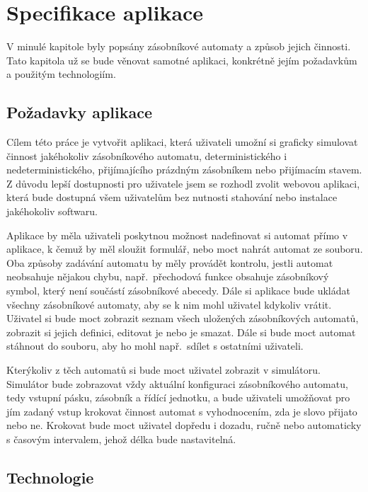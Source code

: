 \chapter{Specifikace aplikace}\label{chap:AppSpecifications}

V minulé kapitole byly popsány zásobníkové automaty a způsob jejich činnosti. Tato kapitola už se bude věnovat samotné aplikaci, konkrétně jejím požadavkům a použitým technologiím.

\section{Požadavky aplikace}\label{sec:AppRequirements}

Cílem této práce je vytvořit aplikaci, která uživateli umožní si graficky simulovat činnost jakéhokoliv zásobníkového automatu, deterministického i nedeterministického, přijímajícího prázdným zásobníkem nebo přijímacím stavem. Z důvodu lepší dostupnosti pro uživatele jsem se rozhodl zvolit webovou aplikaci, která bude dostupná všem uživatelům bez nutnosti stahování nebo instalace jakéhokoliv softwaru. 

Aplikace by měla uživateli poskytnou možnost nadefinovat si automat přímo v aplikace, k čemuž by měl sloužit formulář, nebo moct nahrát automat ze souboru. Oba způsoby zadávání automatu by měly provádět kontrolu, jestli automat neobsahuje nějakou chybu, např.~přechodová funkce obsahuje zásobníkový symbol, který není součástí zásobníkové abecedy. 
Dále si aplikace bude ukládat všechny zásobníkové automaty, aby se k nim mohl uživatel kdykoliv vrátit. Uživatel si bude moct zobrazit seznam všech uložených zásobníkových automatů, zobrazit si jejich definici, editovat je nebo je smazat. Dále si bude moct automat stáhnout do souboru, aby ho mohl např.~sdílet s ostatními uživateli. 

Kterýkoliv z těch automatů si bude moct uživatel zobrazit v simulátoru. Simulátor bude zobrazovat vždy aktuální konfiguraci zásobníkového automatu, tedy vstupní pásku, zásobník a řídící jednotku, a bude uživateli umožňovat pro jím zadaný vstup krokovat činnost automat s vyhodnocením, zda je slovo přijato nebo ne. Krokovat bude moct uživatel dopředu i dozadu, ručně nebo automaticky s časovým intervalem, jehož délka bude nastavitelná.

\section{Technologie}

